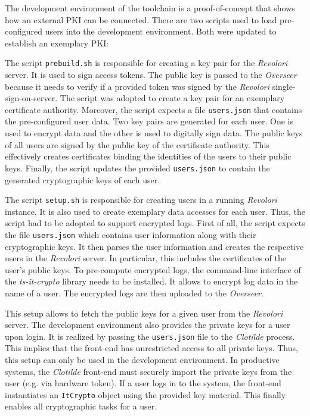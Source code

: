 \documentclass[../main.tex]{subfiles}
\begin{document}
The development environment of the toolchain is a proof-of-concept that shows how an external PKI can be connected.
There are two scripts used to load pre-configured users into the development environment.
Both were updated to establish an exemplary PKI:

The script \verb|prebuild.sh| is responsible for creating a key pair for the \emph{Revolori} server.
It is used to sign access tokens.
The public key is passed to the \emph{Overseer} because it needs to verify if a provided token was signed by the \emph{Revolori} single-sign-on-server.
The script was adopted to create a key pair for an exemplary certificate authority.
Moreover, the script expects a file \verb|users.json| that contains the pre-configured user data.
Two key pairs are generated for each user.
One is used to encrypt data and the other is used to digitally sign data.
The public keys of all users are signed by the public key of the certificate authority.
This effectively creates certificates binding the identities of the users to their public keys.
Finally, the script updates the provided \verb|users.json| to contain the generated cryptographic keys of each user.

The script \verb|setup.sh| is responsible for creating users in a running \emph{Revolori} instance.
It is also used to create exemplary data accesses for each user.
Thus, the script had to be adopted to support encrypted logs.
First of all, the script expects the file \verb|users.json| which contains user information along with their cryptographic keys.
It then parses the user information and creates the respective users in the \emph{Revolori} server.
In particular, this includes the certificates of the user's public keys.
To pre-compute encrypted logs, the command-line interface of the \emph{ts-it-crypto} library needs to be installed.
It allows to encrypt log data in the name of a user.
The encrypted logs are then uploaded to the \emph{Overseer}.

This setup allows to fetch the public keys for a given user from the \emph{Revolori} server.
The development environment also provides the private keys for a user upon login.
It is realized by passing the \verb|users.json| file to the \emph{Clotilde} process.
This implies that the front-end has unrestricted access to all private keys.
Thus, this setup can only be used in the development environment.
In productive systems, the \emph{Clotilde} front-end must securely import the private keys from the user (e.g. via hardware token).
If a user logs in to the system, the front-end instantiates an \verb|ItCrypto| object using the provided key material.
This finally enables all cryptographic tasks for a user.
\end{document}
